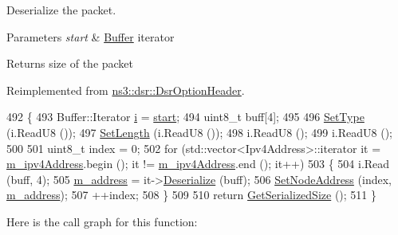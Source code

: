 Deserialize the packet. 


\begin{DoxyParams}{Parameters}
{\em start} & \hyperlink{classns3_1_1Buffer}{Buffer} iterator \\
\hline
\end{DoxyParams}
\begin{DoxyReturn}{Returns}
size of the packet 
\end{DoxyReturn}


Reimplemented from \hyperlink{classns3_1_1dsr_1_1DsrOptionHeader_ab44c93c37011591950bb95730c1c5b06}{ns3\+::dsr\+::\+Dsr\+Option\+Header}.


\begin{DoxyCode}
492 \{
493   Buffer::Iterator \hyperlink{bernuolliDistribution_8m_a6f6ccfcf58b31cb6412107d9d5281426}{i} = \hyperlink{namespacevisualizer_1_1core_a2a35e5d8a34af358b508dac8635754e0}{start};
494   uint8\_t buff[4];
495 
496   \hyperlink{classns3_1_1dsr_1_1DsrOptionHeader_a62b3733f99509fd870ff3ebc9d4513e4}{SetType} (i.ReadU8 ());
497   \hyperlink{classns3_1_1dsr_1_1DsrOptionHeader_ac13ae881ef80b4c2fce6d59f8aa0fa3e}{SetLength} (i.ReadU8 ());
498   i.ReadU8 ();
499   i.ReadU8 ();
500 
501   uint8\_t index = 0;
502   \textcolor{keywordflow}{for} (std::vector<Ipv4Address>::iterator it = \hyperlink{classns3_1_1dsr_1_1DsrOptionRrepHeader_a42818ebd088a2edcdda07b8ed43e4708}{m\_ipv4Address}.begin (); it != 
      \hyperlink{classns3_1_1dsr_1_1DsrOptionRrepHeader_a42818ebd088a2edcdda07b8ed43e4708}{m\_ipv4Address}.end (); it++)
503     \{
504       i.Read (buff, 4);
505       \hyperlink{classns3_1_1dsr_1_1DsrOptionRrepHeader_a2396bcb9c2f0f32237edcef891b87cca}{m\_address} = it->\hyperlink{classns3_1_1Ipv4Address_ac6e205258d95465ce51c148e51590760}{Deserialize} (buff);
506       \hyperlink{classns3_1_1dsr_1_1DsrOptionRrepHeader_a2c31b94323ab71ecf56a4932c746a719}{SetNodeAddress} (index, \hyperlink{classns3_1_1dsr_1_1DsrOptionRrepHeader_a2396bcb9c2f0f32237edcef891b87cca}{m\_address});
507       ++index;
508     \}
509 
510   \textcolor{keywordflow}{return} \hyperlink{classns3_1_1dsr_1_1DsrOptionRrepHeader_adc4d1871dbb978c75e0ca92cf9af387c}{GetSerializedSize} ();
511 \}
\end{DoxyCode}


Here is the call graph for this function\+:


